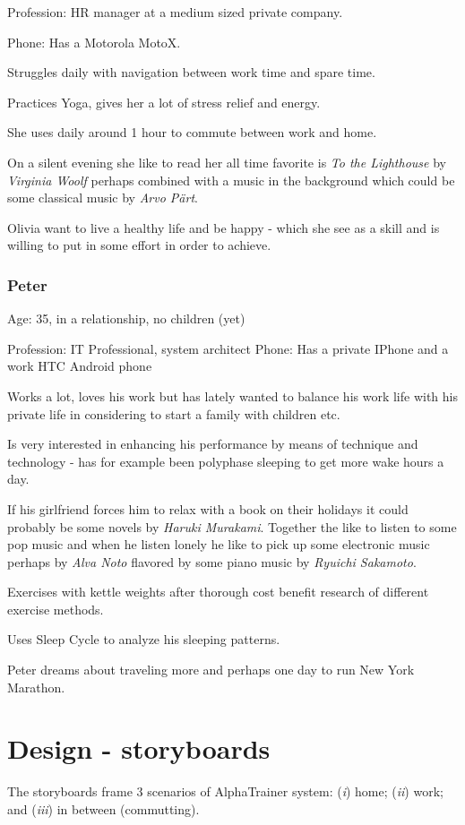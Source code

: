 \documentclass[a4paper,10pt,english,lof,lot,twoside]{puthesis}
\begin{document}
Profession: HR manager at a medium sized private company.

Phone: Has a Motorola MotoX.

Struggles daily with navigation between work time and spare time.

Practices Yoga, gives her a lot of stress relief and energy.

She uses daily around 1 hour to commute between work and home.

On a silent evening she like to read her all time favorite is \emph{To the
Lighthouse} by \emph{Virginia Woolf} perhaps combined with a music in the
background which could be some classical music by \emph{Arvo Pärt}.

Olivia want to live a healthy life and be happy - which she see as a skill
and is willing to put in some effort in order to achieve.


\subsection{Peter}
\label{appendix_design_personas:peter}
Age: 35, in a relationship, no children (yet)

Profession: IT Professional, system architect
Phone: Has a private IPhone and a work HTC Android phone

Works a lot, loves his work but has lately wanted to balance his work
life with his private life in considering to start a family with
children etc.

Is very interested in enhancing his performance by means of technique
and technology - has for example been polyphase sleeping to get more
wake hours a day.

If his girlfriend forces him to relax with a book on their holidays it
could probably be some novels by \emph{Haruki Murakami}. Together the like
to listen to some pop music and when he listen lonely he like to pick
up some electronic music perhaps by \emph{Alva Noto} flavored by some piano
music by \emph{Ryuichi Sakamoto}.

Exercises with kettle weights after thorough cost benefit research of
different exercise methods.

Uses Sleep Cycle to analyze his sleeping patterns.

Peter dreams about traveling more and perhaps one day to run New York Marathon.
\label{appendix_design_storyboards::doc}

\chapter{Design - storyboards}
\label{appendix_design_storyboards:appendix-design-storyboards}\label{appendix_design_storyboards:design-storyboards}
The storyboards frame 3 scenarios of AlphaTrainer system: (\emph{i}) home; (\emph{ii}) work; and (\emph{iii}) in between (commutting).
\end{document}
